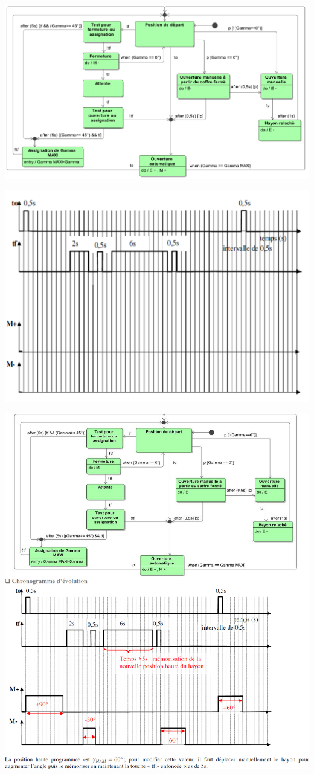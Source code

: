 \documentclass[10pt,fleqn]{article} %
\begin{document}
\begin{center}
\includegraphics[width=.75\linewidth]{images/fig_05.png}

\includegraphics[width=.75\linewidth]{images/fig_04.png}
\end{center}


\begin{center}
\includegraphics[width=\linewidth]{images/fig_06.png}
\end{center}
\end{document}
